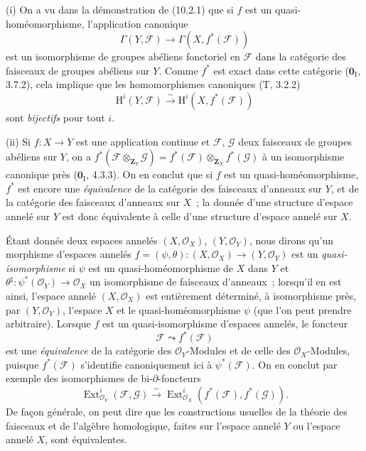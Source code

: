 \begin{remarks}[10.2.8]
\label{IV.10.2.8-fr}
\upshape (i) On a vu dans la démonstration de (10.2.1) que si $f$ est un
quasi-homéomorphisme, l'application canonique
\begin{equation}
\label{IV.10.2.8.1-fr}
\tag{10.2.8.1}
\Gamma(Y,\mathcal F)\to\Gamma(X,f^*(\mathcal F))
\end{equation}
est un isomorphisme de groupes abéliens fonctoriel en $\mathcal F$ dans la
catégorie des faisceaux de groupes abéliens sur $Y$. Comme $f^*$ est exact
dans cette catégorie ($\mathbf 0_{\mathrm I}$, 3.7.2), cela implique que les
homomorphismes canoniques (T, 3.2.2)
\[
\mathrm H^i(Y,\mathcal F)\xrightarrow{\sim}
\mathrm H^i(X,f^*(\mathcal F))
\]
sont \emph{bijectifs} pour tout $i$.

(ii) Si $f:X\to Y$ est une application continue et $\mathcal F$,
$\mathcal G$ deux faisceaux de groupes abéliens sur $Y$, on a
$f^*(\mathcal F\otimes_{\mathbf Z_Y}\mathcal G)=f^*(\mathcal F)\otimes_{\mathbf Z_X}f^*(\mathcal G)$
à un isomorphisme canonique près ($\mathbf 0_{\mathrm I}$, 4.3.3). On en
conclut que si $f$ est un quasi-homéomorphisme, $f^*$ est encore une
\emph{équivalence} de la catégorie des faisceaux d'anneaux sur $Y$, et de la
catégorie des faisceaux d'anneaux sur $X$~; la donnée d'une structure d'espace
annelé sur $Y$ est donc équivalente à celle d'une structure d'espace annelé
sur $X$.

Étant donnés deux espaces annelés $(X,\mathcal O_X)$, $(Y,\mathcal O_Y)$, nous
dirons qu'un morphisme d'espaces annelés
$f=(\psi,\theta):(X,\mathcal O_X)\to(Y,\mathcal O_Y)$ est un
\emph{quasi-isomorphisme} si $\psi$ est un quasi-homéomorphisme de $X$ dans
$Y$ et $\theta^\sharp:\psi^*(\mathcal O_Y)\to\mathcal O_X$ un isomorphisme de
faisceaux d'anneaux~; lorsqu'il en est ainsi, l'espace annelé
$(X,\mathcal O_X)$ est entièrement déterminé, à isomorphisme près, par
$(Y,\mathcal O_Y)$, l'espace $X$ et le quasi-homéomorphisme $\psi$ (que l'on
peut prendre arbitraire). Lorsque $f$ est un quasi-isomorphisme d'espaces
annelés, le foncteur
\[
\mathcal F\leadsto f^*(\mathcal F)
\]
est une \emph{équivalence} de la catégorie des $\mathcal O_Y$-Modules et de
celle des $\mathcal O_X$-Modules, puisque $f^*(\mathcal F)$ s'identifie
canoniquement ici à $\psi^*(\mathcal F)$. On en conclut par exemple des
isomorphismes de bi-$\partial$-foncteurs
\[
\operatorname{Ext}^i_{\mathcal O_Y}(\mathcal F,\mathcal G)
\xrightarrow{\sim}
\operatorname{Ext}^i_{\mathcal O_X}(f^*(\mathcal F),f^*(\mathcal G)).
\]
De façon générale, on peut dire que les constructions usuelles de la théorie
des faisceaux et de l'algèbre homologique, faites sur l'espace annelé $Y$ ou
l'espace annelé $X$, sont équivalentes.
\end{remarks}

